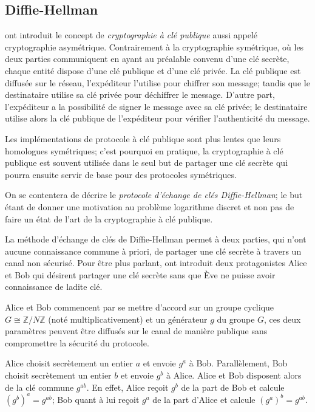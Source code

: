 \documentclass[a4paper]{article}
\theoremstyle{definition}
\theoremstyle{remark}
\numberwithin{equation}{section}
\begin{document}
\subsection{Diffie-Hellman}
\cite{diffie-hellman} ont introduit le concept de \emph{cryptographie à clé publique} aussi appelé cryptographie asymétrique. Contrairement à la cryptographie symétrique, où les deux parties communiquent en ayant au préalable convenu d'une clé secrète, chaque entité dispose d'une clé publique et d'une clé privée. La clé publique est diffusée sur le réseau, l'expéditeur l'utilise pour chiffrer son message; tandis que le destinataire utilise sa clé privée pour déchiffrer le message. D'autre part, l'expéditeur a la possibilité de signer le message avec sa clé privée; le destinataire utilise alors la clé publique de l'expéditeur pour vérifier l'authenticité du message.

Les implémentations de protocole à clé publique sont plus lentes que leurs homologues symétriques; c'est pourquoi en pratique, la cryptographie à clé publique est souvent utilisée dans le seul but de partager une clé secrète qui pourra ensuite servir de base pour des protocoles symétriques.

On se contentera de décrire le \emph{protocole d'échange de clés Diffie-Hellman}; le but étant de donner une motivation au problème logarithme discret et non pas de faire un état de l'art de la cryptographie à clé publique.

La méthode d'échange de clés de Diffie-Hellman permet à deux parties, qui n'ont aucune connaissance commune à priori, de partager une clé secrète à travers un canal non sécurisé. Pour être plus parlant, ont introduit deux protagonistes Alice et Bob qui désirent partager une clé secrète sans que Ève ne puisse avoir connaissance de ladite clé.

Alice et Bob commencent par se mettre d'accord sur un groupe cyclique $G \cong \mathbb{Z}/N\mathbb{Z}$ (noté multiplicativement) et un générateur $g$ du groupe $G$, ces deux paramètres peuvent être diffusés sur le canal de manière publique sans compromettre la sécurité du protocole.

Alice choisit secrètement un entier $a$ et envoie $g^a$ à Bob. Parallèlement, Bob choisit secrètement un entier $b$ et envoie $g^b$ à Alice. Alice et Bob disposent alors de la clé commune $g^{ab}$. En effet, Alice reçoit $g^b$ de la part de Bob et calcule $(g^b)^a = g^{ab}$; Bob quant à lui reçoit $g^a$ de la part d'Alice et calcule $(g^a)^b = g^{ab}$.
\end{document}
